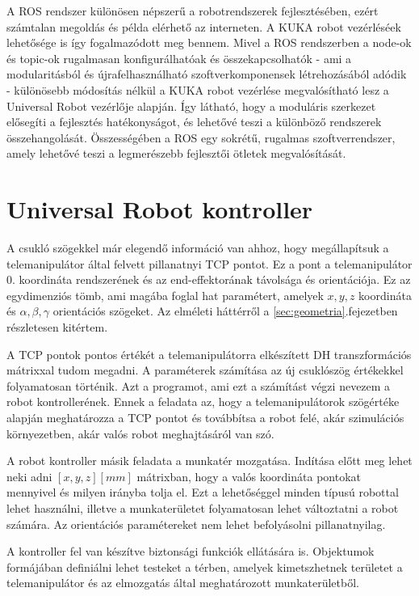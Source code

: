 A ROS rendszer különösen népszerű a robotrendszerek fejlesztésében, ezért számtalan megoldás és példa elérhető az interneten. A KUKA robot vezérléséek lehetősége is így fogalmazódott meg bennem. Mivel a ROS rendszerben a node-ok és topic-ok rugalmasan konfigurálhatóak és összekapcsolhatók - ami a modularitásból és újrafelhasználható szoftverkomponensek létrehozásából adódik - különösebb módosítás nélkül a KUKA robot vezérlése megvalósítható lesz a Universal Robot vezérlője alapján. Így látható, hogy a moduláris szerkezet elősegíti a fejlesztés hatékonyságot, és lehetővé teszi a különböző rendszerek összehangolását. Összességében a ROS egy sokrétű, rugalmas szoftverrendszer, amely lehetővé teszi a legmerészebb fejlesztői ötletek megvalósítását.\cite{ROSnoetic}


\section{Universal Robot kontroller}

A csukló szögekkel már elegendő információ van ahhoz, hogy megállapítsuk a telemanipulátor által felvett pillanatnyi TCP pontot. Ez a pont a telemanipulátor 0. koordináta rendszerének és az end-effektorának távolsága és orientációja. Ez az egydimenziós tömb, ami magába foglal hat paramétert, amelyek $x,y,z$ koordináta és $\alpha,\beta,\gamma$ orientációs szögeket. Az elméleti háttérről a \ref{sec:geometria}.fejezetben részletesen kitértem.

A TCP pontok pontos értékét a telemanipulátorra elkészített DH transzformációs mátrixxal tudom megadni. A paraméterek számítása az új csuklószög értékekkel folyamatosan történik. Azt a programot, ami ezt a számítást végzi nevezem a robot kontrollerének. Ennek a feladata az, hogy a telemanipulátorok szögértéke alapján meghatározza a TCP pontot és továbbítsa a robot felé, akár szimulációs környezetben, akár valós robot meghajtásáról van szó.

A robot kontroller másik feladata a munkatér mozgatása. Indítása előtt meg lehet neki adni $[x,y,z] [mm]$ mátrixban, hogy a valós koordináta pontokat mennyivel és milyen irányba tolja el. Ezt a lehetőséggel minden típusú robottal lehet használni, illetve a munkaterületet folyamatosan lehet változtatni a robot számára. Az orientációs paramétereket nem lehet befolyásolni pillanatnyilag.

A kontroller fel van készítve biztonsági funkciók ellátására is. Objektumok formájában definiálni lehet testeket a térben, amelyek kimetszhetnek területet a telemanipulátor és az elmozgatás által meghatározott munkaterületből.

